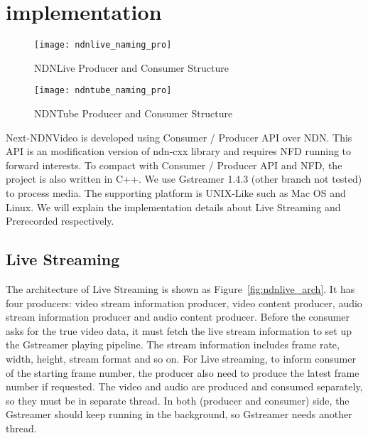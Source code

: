 \section{implementation} %
\label{sec:implementation}
\begin{figure*}%
  \centering
  \texttt{[image: ndnlive\_naming\_pro]}
  \caption{NDNLive Producer and Consumer Structure}
  \label{fig:ndnlive_cp}
\end{figure*}

\begin{figure*}%
  \centering
  \texttt{[image: ndntube\_naming\_pro]}
  \caption{NDNTube Producer and Consumer Structure}
  \label{fig:ndntube_cp}
\end{figure*}

Next-NDNVideo is developed using Consumer / Producer API over NDN. This API is an modification version of ndn-cxx library and requires NFD running to forward interests. To compact with Consumer / Producer API and NFD, the project is also written in C++. We use Gstreamer 1.4.3 (other branch not tested) to process media. The supporting platform is UNIX-Like such as Mac OS and Linux. We will explain the implementation details about Live Streaming and Prerecorded respectively.


\subsection{Live Streaming}
The architecture of Live Streaming is shown as Figure~\ref{fig:ndnlive_arch}. It has four producers: video stream information producer, video content producer, audio stream information producer and audio content producer. Before the consumer asks for the true video data, it must fetch the live stream information to set up the Gstreamer playing pipeline. The stream information includes frame rate, width, height, stream format and so on. For Live streaming, to inform consumer of the starting frame number, the producer also need to produce the latest frame number if requested. The video and audio are produced and consumed separately, so they must be in separate thread. In both (producer and consumer) side, the Gstreamer should keep running in the background, so Gstreamer needs another thread. 

